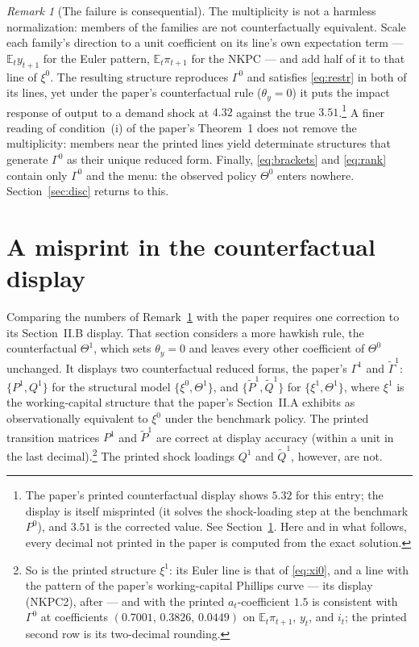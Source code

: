 \documentclass[11pt]{article}
\theoremstyle{remark}
\newtheorem{remark}{Remark}
\newcommand{\E}{\mathbb{E}}
\begin{document}
\begin{remark}[The failure is consequential]\label{rem:conseq}
The multiplicity is not a harmless normalization: members of the families are not counterfactually equivalent. Scale each family's direction to a unit coefficient on its line's own expectation term --- $\E_ty_{t+1}$ for the Euler pattern, $\E_t\pi_{t+1}$ for the NKPC --- and add half of it to that line of $\xi^0$. The resulting structure reproduces $\Gamma^0$ and satisfies \eqref{eq:restr} in both of its lines, yet under the paper's counterfactual rule ($\theta_y=0$) it puts the impact response of output to a demand shock at $4.32$ against the true $3.51$.\footnote{The paper's printed counterfactual display shows $5.32$ for this entry; the display is itself misprinted (it solves the shock-loading step at the benchmark $P^0$), and $3.51$ is the corrected value. See Section~\ref{sec:misprint}. Here and in what follows, every decimal not printed in the paper is computed from the exact solution.} A finer reading of condition~(i) of the paper's Theorem~1 does not remove the multiplicity: members near the printed lines yield determinate structures that generate $\Gamma^0$ as their unique reduced form. Finally, \eqref{eq:brackets} and \eqref{eq:rank} contain only $\Gamma^0$ and the menu: the observed policy $\Theta^0$ enters nowhere. Section~\ref{sec:disc} returns to this.
\end{remark}

\section{A misprint in the counterfactual display}\label{sec:misprint}

Comparing the numbers of Remark~\ref{rem:conseq} with the paper requires one correction to its Section~II.B display. That section considers a more hawkish rule, the counterfactual $\Theta^1$, which sets $\theta_y=0$ and leaves every other coefficient of $\Theta^0$ unchanged. It displays two counterfactual reduced forms, the paper's $\Gamma^1$ and $\tilde\Gamma^1$: $\{P^1,Q^1\}$ for the structural model $\{\xi^0,\Theta^1\}$, and $\{\tilde P^1,\tilde Q^1\}$ for $\{\xi^1,\Theta^1\}$, where $\xi^1$ is the working-capital structure that the paper's Section~II.A exhibits as observationally equivalent to $\xi^0$ under the benchmark policy. The printed transition matrices $P^1$ and $\tilde P^1$ are correct at display accuracy (within a unit in the last decimal).\footnote{So is the printed structure $\xi^1$: its Euler line is that of \eqref{eq:xi0}, and a line with the pattern of the paper's working-capital Phillips curve --- its display (NKPC2), after \citet{Christiano2010} --- and with the printed $a_t$-coefficient $1.5$ is consistent with $\Gamma^0$ at coefficients $(0.7001,\,0.3826,\,0.0449)$ on $\E_t\pi_{t+1}$, $y_t$, and $i_t$; the printed second row is its two-decimal rounding.} The printed shock loadings $Q^1$ and $\tilde Q^1$, however, are not.
\end{document}
